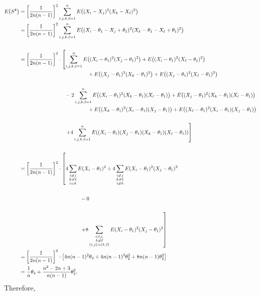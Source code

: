 \documentclass[12pt,letterpaper,reqno]{amsart}
\numberwithin{equation}{subsection}
\begin{document}
\begin{enumerate}[label=(\alph*),leftmargin=*]
    \begin{align*}
        \fun{E}{S^4} &= \left[ \frac{1}{2n(n-1)} \right]^2 \sum_{i,j,k, \ell=1}^n \fun{E}{(X_i - X_j)^2 (X_k - X_{\ell})^2} \\
        &= \left[ \frac{1}{2n(n-1)} \right]^2 \sum_{i,j,k, \ell=1}^n \fun{E}{(X_i - \theta_1 -  X_j + \theta_1)^2 (X_k - \theta_1 -  X_{\ell} + \theta_1)^2} \\
        \\
        &= \left[ \frac{1}{2n(n-1)} \right]^2 \cdot \left[ \sum_{i,j,k,\ell=1}^n \fun{E}{(X_i - \theta_1)^2 (X_j - \theta_1)^2} + \fun{E}{(X_i - \theta_1)^2 (X_{\ell} - \theta_1)^2}  \right. \\
        & \hspace{4.5cm} + \fun{E}{(X_j - \theta_1)^2 (X_{k} - \theta_1)^2} + \fun{E}{(X_j - \theta_1)^2 (X_{\ell} - \theta_1)^2} \\
        \\
        & \hspace{3cm} - 2 \sum_{i,j,k,\ell = 1}^n \fun{E}{(X_i - \theta_1)^2(X_k-\theta_1)(X_{\ell}-\theta_1)} + \fun{E}{(X_j - \theta_1)^2(X_k-\theta_1)(X_{\ell}-\theta_1)} \\
        & \hspace{4.5cm} + \fun{E}{(X_k - \theta_1)^2(X_i-\theta_1)(X_{j}-\theta_1)} + \fun{E}{(X_{\ell} - \theta_1)^2(X_i-\theta_1)(X_{j}-\theta_1)} \\
        \\
        & \hspace{3cm} \left. + 4 \sum_{i,j,k,\ell=1}^n \fun{E}{(X_i-\theta_1)(X_j-\theta_1)(X_k-\theta_1)(X_{\ell}-\theta_1)} \right] \\
        \\
        &= \left[ \frac{1}{2n(n-1)} \right]^2 \cdot \left[ 4 \sum_{\substack{i \not=j \\
        k \not= \ell \\
        i = k}} E(X_i - \theta_1)^4 + 4 \sum_{\substack{i \not=j \\
        k \not= \ell \\
        i \not= k}} E(X_i - \theta_1)^2(X_j - \theta_1)^2 \right. \\
        \\
        & \hspace{4cm} -0 \\
        \\
        &\hspace{4cm} \left. +8 \sum_{\substack{i \not= j, \\
        k \not= \ell \\
        (i,j) = (k, \ell)}} E(X_i - \theta_1)^2 (X_j - \theta_1)^2  \right] \\
        &= \left[ \frac{1}{2n(n-1)} \right]^2 \cdot \left[4 n(n-1)^2\theta_4 + 4n(n-1)^3 \theta_2^2 + 8n(n-1)\theta_2^2 \right] \\
        &= \frac{1}{n} \theta_4 + \frac{n^2-2n+3}{n(n-1)} \theta_2^2.
    \end{align*}
    Therefore,
    

\end{enumerate}
\end{document}
